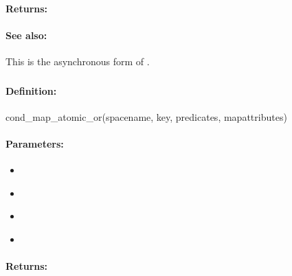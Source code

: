 \paragraph{Returns:}


\paragraph{See also:}  This is the asynchronous form of .

\pagebreak
\subsubsection{}
\label{api:ruby:cond_map_atomic_or}


\paragraph{Definition:}
\begin{rubycode}
cond_map_atomic_or(spacename, key, predicates, mapattributes)
\end{rubycode}

\paragraph{Parameters:}
\begin{itemize}[noitemsep]
\item {}\\

\item {}\\

\item {}\\

\item {}\\

\end{itemize}

\paragraph{Returns:}


